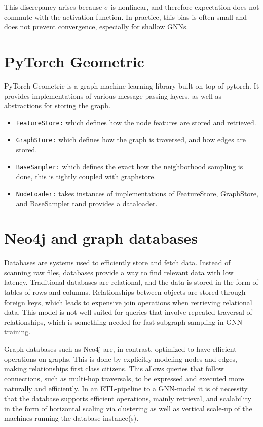 \documentclass[ oneside,openright,titlepage,numbers=noenddot,headinclude,%
                footinclude=true,cleardoublepage=empty,abstractoff, %
                BCOR=0mm,paper=a4,fontsize=11pt,%
                ngerman,american,%
                ]{scrreprt}
\begin{document}
This discrepancy arises because $\sigma$ is nonlinear, and therefore expectation does not commute with the activation function. 
In practice, this bias is often small and does not prevent convergence, especially for shallow GNNs.

\section{PyTorch Geometric}
PyTorch Geometric is a graph machine learning library built on top of pytorch. It provides implementations of various message passing layers, as well as abstractions for storing the graph.



\begin{itemize}
    \item \texttt{FeatureStore:} which defines how the node features are stored and retrieved.
    
    \item \texttt{GraphStore:} which defines how the graph is traversed, and how edges are stored.

    \item \texttt{BaseSampler:} which defines the exact how the neighborhood sampling is done, this is tightly coupled with graphstore.

    \item \texttt{NodeLoader:} takes instances of implementations of FeatureStore, GraphStore, and BaseSampler tand provides a dataloader.
\end{itemize}

\section{Neo4j and graph databases}
Databases are systems used to efficiently store and fetch data. Instead of scanning raw files, databases provide a way to find relevant data with low latency. Traditional databases are relational, and the data is stored in the form of tables of rows and columns. Relationships between objects are stored through foreign keys, which leads to expensive join operations when retrieving relational data.  This model is not well suited for queries that involve repeated traversal of relationships, which is something needed for fast subgraph sampling in GNN training.

Graph databases such as Neo4j are, in contrast, optimized to have efficient operations on graphs. This is done by explicitly modeling nodes and edges, making relationships first class citizens. This allows queries that follow connections, such as multi-hop traversals, to be expressed and executed more naturally and efficiently. 
In an ETL-pipeline to a GNN-model it is of necessity that the database supports efficient operations, mainly retrieval, and scalability in the form of horizontal scaling via clustering as well as vertical scale-up of the machines running the database instance(s).
\end{document}
